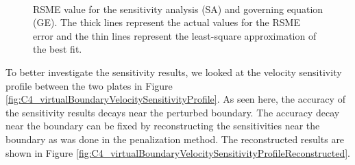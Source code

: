 \begin{figure}[H]
    \centering
    \\
    \caption{RSME value for the sensitivity analysis (SA) and governing equation (GE). The thick lines represent the actual values for the RSME error and the thin lines represent the least-square approximation of the best fit.}
    \label{fig:C4_virtualBoundarySAconvergence}
\end{figure}

To better investigate the sensitivity results, we looked at the velocity sensitivity profile between the two plates in Figure \ref{fig:C4_virtualBoundaryVelocitySensitivityProfile}. As seen here, the accuracy of the sensitivity results decays near the perturbed boundary. The accuracy decay near the boundary can be fixed by reconstructing the sensitivities near the boundary as was done in the penalization method. The reconstructed results are shown in Figure \ref{fig:C4_virtualBoundaryVelocitySensitivityProfileReconstructed}.

